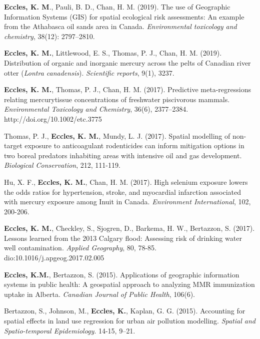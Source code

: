 \documentclass[margin,line]{res}
\begin{document}
\begin{resume}
\textbf{Eccles, K. M}., Pauli, B. D., Chan, H. M. (2019). The use of Geographic Information Systems (GIS) for spatial ecological risk assessments: An example from the Athabasca oil sands area in Canada. \textit{Environmental toxicology and chemistry}, 38(12): 2797–2810.

\textbf{Eccles, K. M.}, Littlewood, E. S., Thomas, P. J., Chan, H. M. (2019). Distribution of organic and inorganic mercury across the pelts of Canadian river otter (\textit{Lontra canadensis}). \textit{Scientific reports}, 9(1), 3237.

\textbf{Eccles, K. M.}, Thomas, P. J., Chan, H. M. (2017). Predictive meta-regressions relating mercurytissue concentrations of freshwater piscivorous mammals. \textit{Environmental Toxicology and Chemistry}, 36(6), 2377–2384. http://doi.org/10.1002/etc.3775

Thomas, P. J., \textbf{Eccles, K. M.}, Mundy, L. J. (2017). Spatial modelling of non-target exposure to anticoagulant rodenticides can inform mitigation options in two boreal predators inhabiting areas with intensive oil and gas development. \textit{Biological Conservation}, 212, 111-119.

Hu, X. F., \textbf{Eccles, K. M.}, Chan, H. M. (2017). High selenium exposure lowers the odds ratios for hypertension, stroke, and myocardial infarction associated with mercury exposure among Inuit in Canada. \textit{Environment International}, 102, 200-206.

\textbf{Eccles, K. M.}, Checkley, S., Sjogren, D., Barkema, H. W., Bertazzon, S. (2017). Lessons learned from the 2013 Calgary flood: Assessing risk of drinking water well contamination. \textit{Applied Geography}, 80, 78-85. dio:10.1016/j.apgeog.2017.02.005

\textbf{Eccles, K.M.}, Bertazzon, S. (2015). Applications of geographic information systems in public health: A geospatial approach to analyzing MMR immunization uptake in Alberta. \textit{Canadian Journal of Public Health}, 106(6).

Bertazzon, S., Johnson, M., \textbf{Eccles, K.}, Kaplan, G. G. (2015). Accounting for spatial effects in land use regression for urban air pollution modelling. \textit{Spatial and Spatio-temporal Epidemiology}. 14-15, 9–21.

\vspace*{.1in}



\end{resume}
\end{document}
